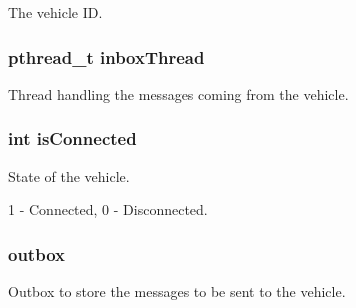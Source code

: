 The vehicle ID. 

\subsubsection[{\texorpdfstring{inbox\+Thread}{inboxThread}}]{\setlength{\rightskip}{0pt plus 5cm}pthread\+\_\+t inbox\+Thread}\hypertarget{struct_s_a___v_e_h_i_c_l_e___d_a_t_a_ab10e40b00b3f87791ade78b71e7e7134}{}\label{struct_s_a___v_e_h_i_c_l_e___d_a_t_a_ab10e40b00b3f87791ade78b71e7e7134}


Thread handling the messages coming from the vehicle. 

\subsubsection[{\texorpdfstring{is\+Connected}{isConnected}}]{\setlength{\rightskip}{0pt plus 5cm}int is\+Connected}\hypertarget{struct_s_a___v_e_h_i_c_l_e___d_a_t_a_aa358768cbc9b8ed27055d5b41726d79a}{}\label{struct_s_a___v_e_h_i_c_l_e___d_a_t_a_aa358768cbc9b8ed27055d5b41726d79a}


State of the vehicle. 

1 -\/ Connected, 0 -\/ Disconnected. 
\subsubsection[{\texorpdfstring{outbox}{outbox}}]{ outbox}\hypertarget{struct_s_a___v_e_h_i_c_l_e___d_a_t_a_a61ac2e690cdfc9dce53b70b6588a2627}{}\label{struct_s_a___v_e_h_i_c_l_e___d_a_t_a_a61ac2e690cdfc9dce53b70b6588a2627}


Outbox to store the messages to be sent to the vehicle. 

